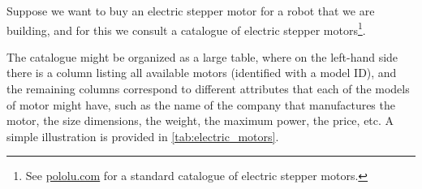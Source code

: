 Suppose we want to buy an electric stepper motor for a robot that we are building, and for this we consult a catalogue of electric stepper motors\footnote{See \href{https://www.pololu.com/category/87/stepper-motors}{pololu.com} for a standard catalogue of electric stepper motors.}.

The catalogue might be organized as a large table, where on the left-hand side there is a column listing all available motors (identified with a model ID), and the remaining columns correspond to different attributes that each of the models of motor might have, such as the name of the company that manufactures the motor, the size dimensions, the weight, the maximum power, the price, etc. A simple illustration is provided in \cref{tab:electric_motors}.

\begin{table}[h]
    \centering
    \caption{A simplified catalogue of motors.}
    \label{tab:electric_motors}
\end{table}



